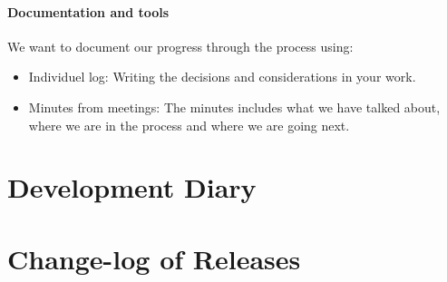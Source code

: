 \documentclass[11pt]{article}
\begin{document}
\paragraph{Documentation and tools}
We want to document our progress through the process using:
\begin{itemize}
    \item Individuel log: Writing the decisions and considerations in your work.
    \item Minutes from meetings: The minutes includes what we have talked about, where we are in the process and where we are going next.
\end{itemize}

\section{Development Diary}

\section{Change-log of Releases}
\end{document}
